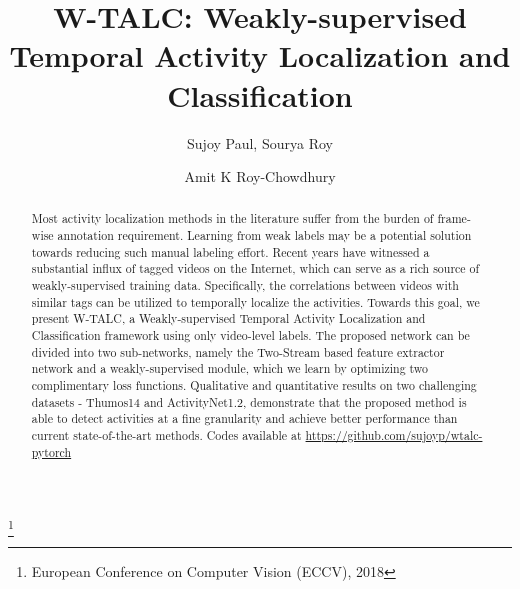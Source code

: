 \documentclass[runningheads]{llncs}
\begin{document}
\title{W-TALC: Weakly-supervised Temporal Activity Localization and Classification} 



\author{Sujoy Paul, Sourya Roy \and Amit K Roy-Chowdhury}




\maketitle              

{\let\thefootnote\relax\footnote{{European Conference on Computer Vision (ECCV), 2018}}}
\vspace*{-10mm}

\begin{abstract}
Most activity localization methods in the literature suffer from the burden of frame-wise annotation requirement. Learning from weak labels may be a potential solution towards reducing such manual labeling effort. Recent years have witnessed a substantial influx of tagged videos on the Internet, which can serve as a rich source of weakly-supervised training data. Specifically, the correlations between videos with similar tags can be utilized to temporally localize the activities. Towards this goal, we present W-TALC, a Weakly-supervised Temporal Activity Localization and Classification framework using only video-level labels. The proposed network can be divided into two sub-networks, namely the Two-Stream based feature extractor network and a weakly-supervised module, which we learn by optimizing two complimentary loss functions. Qualitative and quantitative results on two challenging datasets - Thumos14 and ActivityNet1.2, demonstrate that the proposed method is able to detect activities at a fine granularity and achieve better performance than current state-of-the-art methods. Codes available at \href{https://github.com/sujoyp/wtalc-pytorch}{https://github.com/sujoyp/wtalc-pytorch}

\end{abstract}
\end{document}
